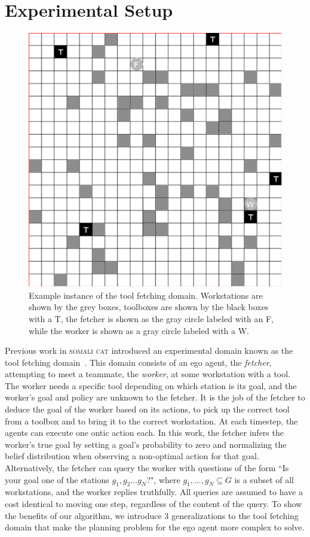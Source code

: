 \documentclass[letterpaper]{article}
\begin{document}
\section{Experimental Setup}
\begin{figure}
\centering
\includegraphics[width=0.6\linewidth]{Figures/ToolFetchingDomain_MultiTools_2.pdf}
\caption{Example instance of the tool fetching domain. Workstations are shown by the grey boxes, toolboxes are shown by the black boxes with a T, the fetcher is shown as the gray circle labeled with an F, while the worker is shown as a gray circle labeled with a W.}
\label{fig:domain_example}
\end{figure}

Previous work in \textsc{somali cat} introduced an experimental domain known as the tool fetching domain~\cite{mirskypenny}. This domain consists of an ego agent, the \emph{fetcher}, attempting to meet a teammate, the \emph{worker}, at some workstation with a tool. The worker needs a specific tool depending on which station is its goal, and the worker's goal and policy are unknown to the fetcher. It is the job of the fetcher to deduce the goal of the worker based on its actions, to pick up the correct tool from a toolbox and to bring it to the correct workstation. At each timestep, the agents can execute one ontic action each. In this work, the fetcher infers the worker's true goal by setting a goal's probability to zero and normalizing the belief distribution when observing a non-optimal action for that goal. Alternatively, the fetcher can query the worker with questions of the form ``Is your goal one of the stations $g_1,g_2...g_N$?", where $g_1, \ldots, g_N \subseteq G$ is a subset of all workstations, and the worker replies truthfully. All queries are assumed to have a cost identical to moving one step, regardless of the content of the query.
To show the benefits of our algorithm, we introduce 3 generalizations to the tool fetching domain that make the planning problem for the ego agent more complex to solve.
\end{document}
